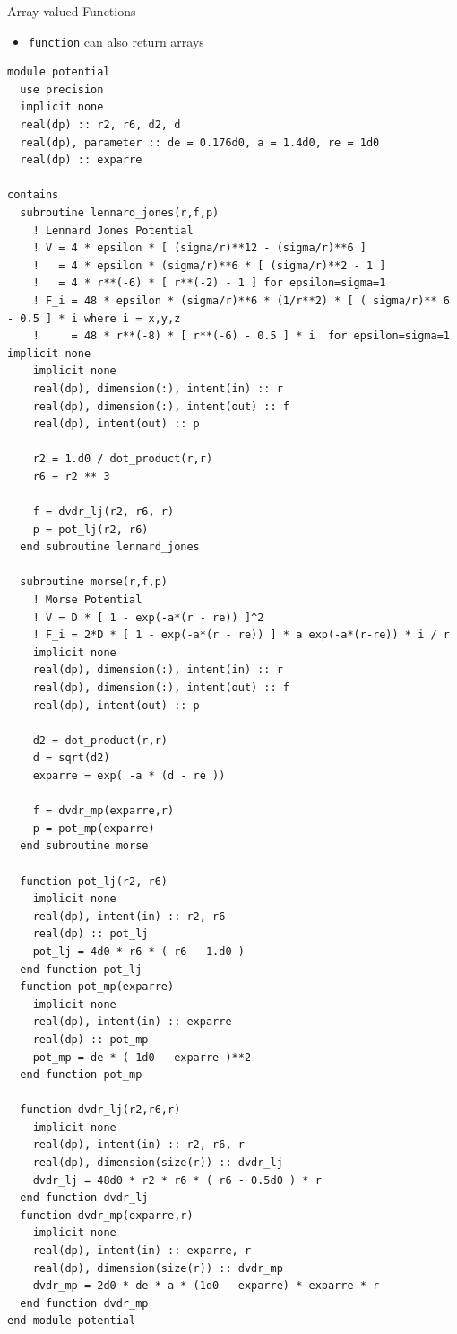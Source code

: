 \documentclass[c,mathserif,compress,xcolor=svgnames]{beamer}
\newcommand{\lstfortran}[1]{\lstinline[language={[90]Fortran},basicstyle=\footnotesize\ttfamily]|#1|}
\newenvironment{eblock}[0]
{
\begin{beamerboxesrounded}[upper=uppercol2,lower=lowercol2,shadow=true]}
{\end{beamerboxesrounded}}
\begin{document}
\begin{frame}[fragile]{Array-valued Functions}
  \begin{itemize}
    \item \lstfortran{function} can also return arrays
  \end{itemize}
      \begin{lstlisting}[language={[90]Fortran},basicstyle=\fontsize{4}{5}\selectfont\ttfamily,multicols=2]
module potential
  use precision
  implicit none
  real(dp) :: r2, r6, d2, d
  real(dp), parameter :: de = 0.176d0, a = 1.4d0, re = 1d0
  real(dp) :: exparre
  
contains
  subroutine lennard_jones(r,f,p)
    ! Lennard Jones Potential
    ! V = 4 * epsilon * [ (sigma/r)**12 - (sigma/r)**6 ]
    !   = 4 * epsilon * (sigma/r)**6 * [ (sigma/r)**2 - 1 ]
    !   = 4 * r**(-6) * [ r**(-2) - 1 ] for epsilon=sigma=1
    ! F_i = 48 * epsilon * (sigma/r)**6 * (1/r**2) * [ ( sigma/r)** 6 - 0.5 ] * i where i = x,y,z
    !     = 48 * r**(-8) * [ r**(-6) - 0.5 ] * i  for epsilon=sigma=1    implicit none
    implicit none
    real(dp), dimension(:), intent(in) :: r
    real(dp), dimension(:), intent(out) :: f
    real(dp), intent(out) :: p

    r2 = 1.d0 / dot_product(r,r)
    r6 = r2 ** 3

    f = dvdr_lj(r2, r6, r)
    p = pot_lj(r2, r6)
  end subroutine lennard_jones

  subroutine morse(r,f,p)
    ! Morse Potential
    ! V = D * [ 1 - exp(-a*(r - re)) ]^2
    ! F_i = 2*D * [ 1 - exp(-a*(r - re)) ] * a exp(-a*(r-re)) * i / r  
    implicit none
    real(dp), dimension(:), intent(in) :: r
    real(dp), dimension(:), intent(out) :: f
    real(dp), intent(out) :: p

    d2 = dot_product(r,r)
    d = sqrt(d2)
    exparre = exp( -a * (d - re ))
    
    f = dvdr_mp(exparre,r)
    p = pot_mp(exparre)
  end subroutine morse

  function pot_lj(r2, r6)
    implicit none
    real(dp), intent(in) :: r2, r6
    real(dp) :: pot_lj
    pot_lj = 4d0 * r6 * ( r6 - 1.d0 )
  end function pot_lj
  function pot_mp(exparre)
    implicit none
    real(dp), intent(in) :: exparre
    real(dp) :: pot_mp
    pot_mp = de * ( 1d0 - exparre )**2
  end function pot_mp

  function dvdr_lj(r2,r6,r)
    implicit none
    real(dp), intent(in) :: r2, r6, r
    real(dp), dimension(size(r)) :: dvdr_lj
    dvdr_lj = 48d0 * r2 * r6 * ( r6 - 0.5d0 ) * r
  end function dvdr_lj
  function dvdr_mp(exparre,r)
    implicit none
    real(dp), intent(in) :: exparre, r
    real(dp), dimension(size(r)) :: dvdr_mp
    dvdr_mp = 2d0 * de * a * (1d0 - exparre) * exparre * r
  end function dvdr_mp
end module potential
      \end{lstlisting}
\end{frame}
\end{document}
